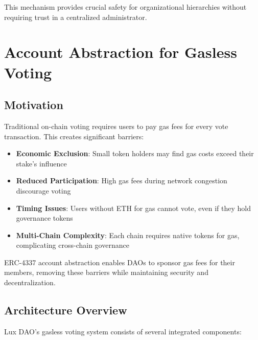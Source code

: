 \documentclass[11pt,a4paper]{article}
\begin{document}
This mechanism provides crucial safety for organizational hierarchies without requiring trust in a centralized administrator.

\section{Account Abstraction for Gasless Voting}

\subsection{Motivation}

Traditional on-chain voting requires users to pay gas fees for every vote transaction. This creates significant barriers:

\begin{itemize}
    \item \textbf{Economic Exclusion}: Small token holders may find gas costs exceed their stake's influence
    \item \textbf{Reduced Participation}: High gas fees during network congestion discourage voting
    \item \textbf{Timing Issues}: Users without ETH for gas cannot vote, even if they hold governance tokens
    \item \textbf{Multi-Chain Complexity}: Each chain requires native tokens for gas, complicating cross-chain governance
\end{itemize}

ERC-4337 account abstraction enables DAOs to sponsor gas fees for their members, removing these barriers while maintaining security and decentralization.

\subsection{Architecture Overview}

Lux DAO's gasless voting system consists of several integrated components:
\end{document}
